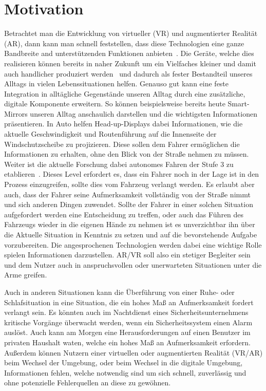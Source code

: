 \section{Motivation}\label{sec:motivation}

Betrachtet man die Entwicklung von virtueller (VR) und augmentierter Realität (AR), dann kann man schnell feststellen, dass diese Technologien eine ganze Bandbreite and unterstützenden Funktionen anbieten~\cite{hughes2005mixed,medenica2011augmented,hayhurst2018augmented}. Die Geräte, welche dies realisieren können bereits in naher Zukunft um ein Vielfaches kleiner und damit auch handlicher produziert werden~\cite{shibata2002head} und dadurch als fester Bestandteil unseres Alltags in vielen Lebenssituationen helfen.
Genauso gut kann eine feste Integration in alltägliche Gegenstände unseren Alltag durch eine zusätzliche, digitale Komponente erweitern. So können beispielsweise bereits heute Smart-Mirrors unseren Alltag anschaulich darstellen und die wichtigsten Informationen präsentieren. 
In Auto helfen Head-up-Displays dabei Informationen, wie die aktuelle Geschwindigkeit und Routenführung auf die Innenseite der Windschutzscheibe zu projizieren. Diese sollen dem Fahrer ermöglichen die Informationen zu erhalten, ohne den Blick von der Straße nehmen zu müssen.
Weiter ist die aktuelle Forschung dabei autonomes Fahren der Stufe 3 zu etablieren~\cite{rodel2014towards}. Dieses Level erfordert es, dass ein Fahrer noch in der Lage ist in den Prozess einzugreifen, sollte dies vom Fahrzeug verlangt werden. Es erlaubt aber auch, dass der Fahrer seine Aufmerksamkeit vollständig von der Straße nimmt und sich anderen Dingen zuwendet.
Sollte der Fahrer in einer solchen Situation aufgefordert werden eine Entscheidung zu treffen, oder auch das Führen des Fahrzeugs wieder in die eigenen Hände zu nehmen ist es unverzichtbar ihn über die Aktuelle Situation in Kenntnis zu setzen und auf die bevorstehende Aufgabe vorzubereiten. 
Die angesprochenen Technologien werden dabei eine wichtige Rolle spielen Informationen darzustellen. AR/VR soll also ein stetiger Begleiter sein und dem Nutzer auch in anspruchsvollen oder unerwarteten Situationen unter die Arme greifen.

Auch in anderen Situationen kann die Überführung von einer Ruhe- oder Schlafsituation in eine Situation, die ein hohes Maß an Aufmerksamkeit fordert verlangt sein. Es könnten auch im Nachtdienst eines Sicherheitsunternehmens kritische Vorgänge überwacht werden, wenn ein Sicherheitssystem einen Alarm auslöst. Auch kann am Morgen eine Herausforderungen auf einen Benutzer im privaten Haushalt waten, welche ein hohes Maß an Aufmerksamkeit erfordern. 
Außerdem können Nutzern einer virtuellen oder augmentierten Realität (VR/AR) beim Wechsel der Umgebung, oder beim Wechsel in die digitale Umgebung, Informationen fehlen, welche notwendig sind um sich schnell, zuverlässig und ohne potenzielle Fehlerquellen an diese zu gewöhnen.


